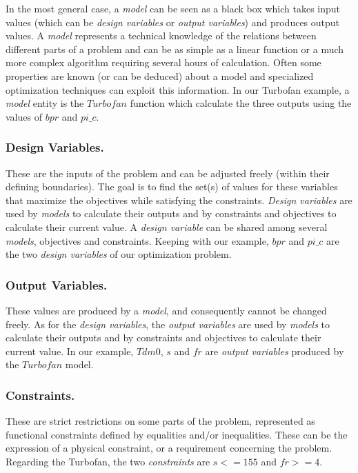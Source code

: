 In the most general case, a \emph{model} can be seen as a black box which takes input values (which can be \emph{design variables} or \emph{output variables}) and produces output values. A \emph{model} represents a technical knowledge of the relations between different parts of a problem and can be as simple as a linear function or a much more complex algorithm requiring several hours of calculation. Often some properties are known (or can be deduced) about a model and specialized optimization techniques can exploit this information.
In our Turbofan example, a \emph{model} entity is the $Turbofan$ function which calculate the three outputs using the values of $bpr$ and $pi\_c$.

\subsubsection*{Design Variables.}

These are the inputs of the problem and can be adjusted freely (within their defining boundaries). The goal is to find the set(s) of values for these variables that maximize the objectives while satisfying the constraints.
\emph{Design variables} are used by \emph{models} to calculate their outputs and by constraints and objectives to calculate their current value. A \emph{design variable} can be shared among several \emph{models}, objectives and constraints.
Keeping with our example, $bpr$ and $pi\_c$ are the two \emph{design variables} of our optimization problem.

\subsubsection*{Output Variables.}

These values are produced by a \emph{model}, and consequently cannot be changed freely.
As for the \emph{design variables}, the \emph{output variables} are used by \emph{models} to calculate their outputs and by constraints and objectives to calculate their current value.
In our example, $Tdm0$, $s$ and $fr$ are \emph{output variables} produced by the $Turbofan$ model.

\subsubsection*{Constraints.}

These are strict restrictions on some parts of the problem, represented as functional constraints defined by equalities and/or inequalities. These can be the expression of a physical constraint, or a requirement concerning the problem.
Regarding the Turbofan, the two \emph{constraints} are $s <= 155$ and $fr >=4$.

